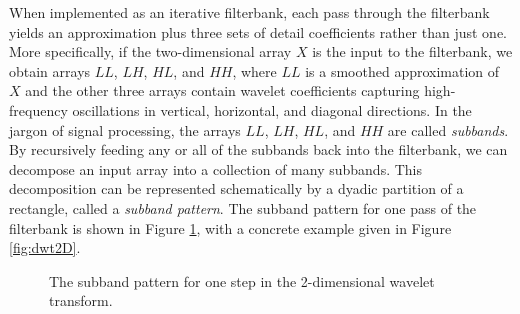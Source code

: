 When implemented as an iterative filterbank, each pass through the filterbank yields an approximation plus three sets of detail coefficients
rather than just one.
More specifically, if the two-dimensional array $X$ is the input to the filterbank, we obtain arrays $LL$, $LH$, $HL$, and $HH$,
where $LL$ is a smoothed approximation of $X$ and the other three arrays contain wavelet coefficients capturing high-frequency
oscillations in vertical, horizontal, and diagonal directions.
In the jargon of signal processing, the arrays $LL$, $LH$, $HL$, and $HH$ are called \emph{subbands}.
By recursively feeding any or all of the subbands back into the filterbank, we can decompose an input array into a collection
of many subbands.
This decomposition can be represented schematically by a dyadic partition of a rectangle, called a \emph{subband pattern}.
The subband pattern for one pass of the filterbank is shown in Figure \ref{fig:2dsubbands}, with a concrete example given in Figure \ref{fig:dwt2D}.
\begin{figure}
\caption{The subband pattern for one step in the 2-dimensional wavelet transform.}
\label{fig:2dsubbands}
\end{figure}
